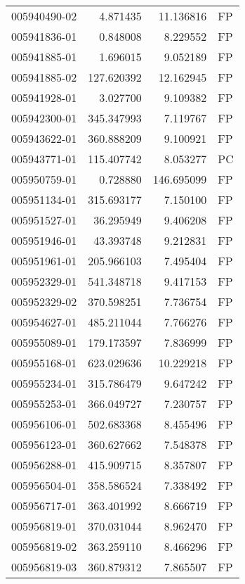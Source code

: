 \begin{tabular}{lrrl}
005940490-02 &    4.871435 &      11.136816 &   FP \\
005941836-01 &    0.848008 &       8.229552 &   FP \\
005941885-01 &    1.696015 &       9.052189 &   FP \\
005941885-02 &  127.620392 &      12.162945 &   FP \\
005941928-01 &    3.027700 &       9.109382 &   FP \\
005942300-01 &  345.347993 &       7.119767 &   FP \\
005943622-01 &  360.888209 &       9.100921 &   FP \\
005943771-01 &  115.407742 &       8.053277 &   PC \\
005950759-01 &    0.728880 &     146.695099 &   FP \\
005951134-01 &  315.693177 &       7.150100 &   FP \\
005951527-01 &   36.295949 &       9.406208 &   FP \\
005951946-01 &   43.393748 &       9.212831 &   FP \\
005951961-01 &  205.966103 &       7.495404 &   FP \\
005952329-01 &  541.348718 &       9.417153 &   FP \\
005952329-02 &  370.598251 &       7.736754 &   FP \\
005954627-01 &  485.211044 &       7.766276 &   FP \\
005955089-01 &  179.173597 &       7.836999 &   FP \\
005955168-01 &  623.029636 &      10.229218 &   FP \\
005955234-01 &  315.786479 &       9.647242 &   FP \\
005955253-01 &  366.049727 &       7.230757 &   FP \\
005956106-01 &  502.683368 &       8.455496 &   FP \\
005956123-01 &  360.627662 &       7.548378 &   FP \\
005956288-01 &  415.909715 &       8.357807 &   FP \\
005956504-01 &  358.586524 &       7.338492 &   FP \\
005956717-01 &  363.401992 &       8.666719 &   FP \\
005956819-01 &  370.031044 &       8.962470 &   FP \\
005956819-02 &  363.259110 &       8.466296 &   FP \\
005956819-03 &  360.879312 &       7.865507 &   FP \\

\end{tabular}
